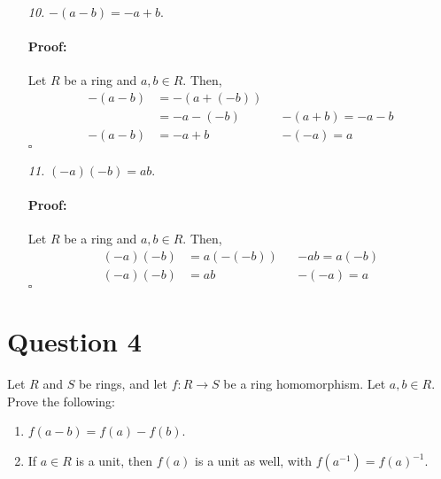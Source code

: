 \documentclass [12pt] {article}
\newenvironment{proof}{\paragraph{Proof:}}{\hfill$\square$}
\renewcommand{\it}[1]{\textit{{#1}}}
\begin{document}
\begin{enumerate}
        \begin{proof}
            Let $R$ be a ring and $a, b \in R$. Then, 
            \begin{align*}
                -(a + b) &= 0 - (a + b)) \\
                         &= 0 + 0 - (a + b)) \\
                         &= (a - a) + (-b + b) - (a + b) \\
                         &= a + (-a - b) + b - (a + b) && a - b = a + (-b) \\
                         &= (-a - b) + (a + b) - (a + b) \\
                         &= (-a - b) + 0 \\
                -(a + b) &= -a - b
            \end{align*}
        \end{proof}
    \item[\it{10.}] $-(a - b) = -a + b$. \vspace{-12pt}

        \begin{proof}
            Let $R$ be a ring and $a, b \in R$. Then,
            \begin{align*}
                -(a - b) &= -(a + (-b)) \\
                         &= -a - (-b) && -(a + b) = -a - b \\
                -(a - b) &= -a + b && -(-a) = a
            \end{align*}
        \end{proof}
    \item[\it{11.}] $(-a)(-b) = ab$. \vspace{-12pt}

        \begin{proof}
            Let $R$ be a ring and $a, b \in R$. Then,
            \begin{align*}
                (-a)(-b) &= a(-(-b)) && -ab = a(-b) \\
                (-a)(-b) &= ab && -(-a) = a
            \end{align*}
        \end{proof}
\end{enumerate}
\newpage

\section*{Question 4}
Let $R$ and $S$ be rings, and let $f:R\to S$ be a ring homomorphism. Let $a,b\in R$. Prove the following: 
    \begin{enumerate}
        \item $f(a-b)=f(a)-f(b)$.
        \item If $a\in R$ is a unit, then $f(a)$ is a unit as well, with $f(a^{-1})=f(a)^{-1}$.
    \end{enumerate}
\end{document}
